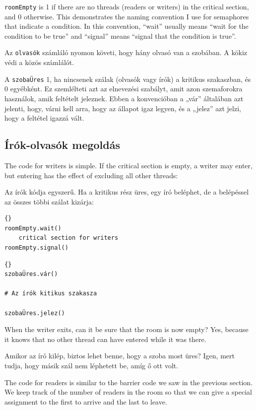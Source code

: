 \documentclass{book}
\newcommand{\clearemptydoublepage}{\newpage\cleardoublepage}
\begin{document}
{\tt roomEmpty} is 1 if there are no threads (readers or writers) in
the critical section, and 0 otherwise.  This demonstrates the naming
convention I use for semaphores that indicate a condition.  In
this convention, ``wait'' usually means ``wait for the condition to
be true'' and ``signal'' means ``signal that the condition is true''.

Az {\tt olvasók} számláló nyomon követi, hogy hány olvasó van a szobában.
A kökiz védi a közös számlálót.

A {\tt szobaÜres} 1, ha nincsenek szálak (olvasók vagy írók) a kritikus
szakaszban, és 0 egyébként. Ez szemlélteti azt az elnevezési szabályt,
amit azon szemaforokra használok, amik feltételt jeleznek.
Ebben a konvencióban a „vár” általában azt jelenti, hogy,
várni kell arra, hogy az állapot igaz legyen, és a „jelez” azt
jelzi, hogy a feltétel igazzá vált.

\clearemptydoublepage
\subsection{Írók-olvasók megoldás}

The code for writers is simple.  If the critical section
is empty, a writer may enter, but entering has the effect
of excluding all other threads:

Az írók kódja egyszerű. Ha a kritikus rész üres,
egy író beléphet, de a belépéssel az összes többi szálat kizárja:

\begin{lstlisting}[title={Writers solution}]{}
roomEmpty.wait()
    critical section for writers
roomEmpty.signal()
\end{lstlisting}

\begin{lstlisting}[title={Írók megoldás}]{}
szobaÜres.vár()

# Az írók kitikus szakasza

szobaÜres.jelez()
\end{lstlisting}

When the writer exits, can it be sure that the room is
now empty?  Yes, because it knows that no other thread can
have entered while it was there.

Amikor az író kilép, biztos lehet benne, hogy a szoba most üres?
Igen, mert tudja, hogy másik szál nem léphetett be, amíg ő ott volt.

The code for readers is similar to the barrier code we
saw in the previous section.  We keep track of the number
of readers in the room so that we can give a special assignment
to the first to arrive and the last to leave.
\end{document}
